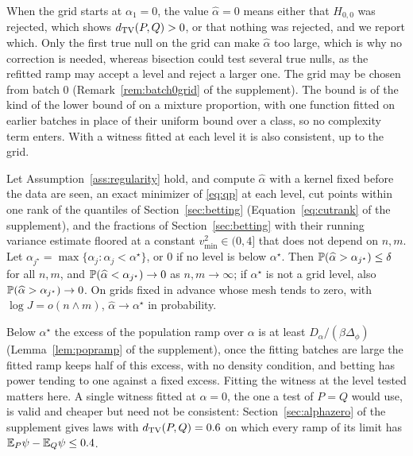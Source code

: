 When the grid starts at $\alpha_1=0$, the value $\widehat\alpha=0$ means either that $H_{0,0}$ was rejected, which
shows $d_{\mathrm{TV}}(P,Q)>0$, or that nothing was rejected, and we report which. Only the first true null on the grid can make
$\widehat\alpha$ too large, which is why no correction is needed, whereas bisection could test several true nulls, as
the refitted ramp may accept a level and reject a larger one. The grid may be chosen from batch $0$
(Remark~\ref{rem:batch0grid} of the supplement). The bound is of the kind of the lower bound of
\citet[Theorem~7]{blanchard2010semi} on a mixture proportion, with one function fitted on earlier batches in place of
their uniform bound over a class, so no complexity term enters. With a witness fitted at each level it is also
consistent, up to the grid.

\begin{proposition}
\label{prop:loconsistency}
Let Assumption~\ref{ass:regularity} hold, and compute $\widehat\alpha$ with a kernel fixed before the data are seen,
an exact minimizer of \eqref{eq:qp} at each level, cut points within one rank of the quantiles of
Section~\ref{sec:betting} (Equation~\eqref{eq:cutrank} of the supplement), and the fractions of
Section~\ref{sec:betting} with their running variance estimate floored at a constant $v^2_{\min}\in(0,4]$ that does
not depend on $n,m$. Let $\alpha_{j^\star}=\max\{\alpha_j:\alpha_j<\alpha^\star\}$,
or $0$ if no level is below $\alpha^\star$. Then $\mathbb{P}(\widehat\alpha>\alpha_{j^\star})\le\delta$ for all
$n,m$, and $\mathbb{P}(\widehat\alpha<\alpha_{j^\star})\to0$ as $n,m\to\infty$; if $\alpha^\star$ is not a grid
level, also $\mathbb{P}(\widehat\alpha>\alpha_{j^\star})\to0$. On grids fixed in advance whose mesh tends to
zero, with $\log J=o(n\wedge m)$, $\widehat\alpha\to\alpha^\star$ in probability.
\end{proposition}

Below $\alpha^\star$ the excess of the population ramp over $\alpha$ is at least $D_\alpha/(\beta \Delta_\phi)$
(Lemma~\ref{lem:popramp} of the supplement), once the fitting batches are large the fitted ramp keeps half of this
excess, with no density condition, and betting has power tending to one against a fixed excess. Fitting the witness at
the level tested matters here. A single witness fitted at $\alpha=0$, the one a test of $P=Q$ would use, is valid and cheaper but need not be consistent:
Section~\ref{sec:alphazero} of the supplement gives laws with $d_{\mathrm{TV}}(P,Q)=0.6$ on which every ramp of its limit has
$\mathbb{E}_P\psi-\mathbb{E}_Q\psi\le0.4$.


